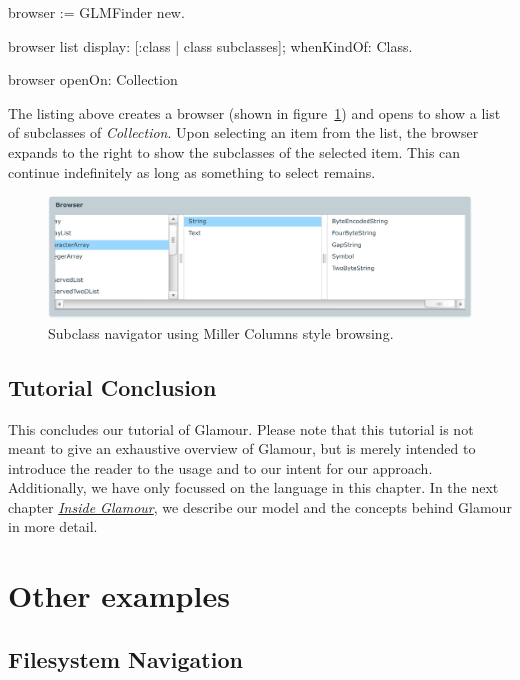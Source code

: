 \documentclass[a4paper,10pt,twoside]{book}
\begin{document}
\begin{code}{}
browser := GLMFinder new.

browser list
  display: [:class | class subclasses];
  whenKindOf: Class.

browser openOn: Collection
\end{code}

The listing above creates a browser (shown in figure~\ref{fig:finder})
and opens to show a list of subclasses of \emph{Collection}. Upon
selecting an item from the list, the browser expands to the right to
show the subclasses of the selected item. This can continue
indefinitely as long as something to select remains.

\begin{figure}[htbp]
\centerline{\includegraphics[width=\linewidth]{finder.pdf}}
\caption{Subclass navigator using Miller Columns style browsing.}
\label{fig:finder}
\end{figure}

\subsection{Tutorial Conclusion}

This concludes our tutorial of Glamour. Please note that this tutorial is not meant to give an exhaustive overview of Glamour, but is merely intended to introduce the reader to the usage and to our intent for our approach. Additionally, we have only focussed on the language in this chapter. In the next chapter \hyperref[chp:design]{\emph{Inside Glamour}}, we describe our model and the concepts behind Glamour in more detail.



\section{Other examples}

\subsection{Filesystem Navigation}
\end{document}
